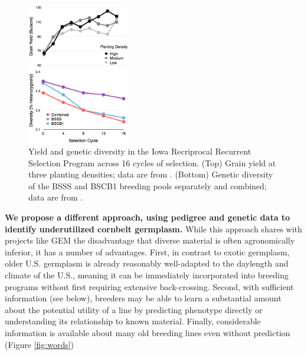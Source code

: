 \documentclass[12pt]{article}
\begin{document}
% 
%
\begin{figure}
    \includegraphics[width=0.4\textwidth]{BSSS.png}
  \caption{Yield and genetic diversity in the Iowa Recriprocal Recurrent Selection Program across 16 cycles of selection. (Top) Grain yield at three planting densities; data are from \citet{rouse2003selection}. (Bottom) Genetic diversity of the BSSS and BSCB1 breeding pools separately and combined; data are from \citet{Gerke:2013tw}.}
\label{fig:trends}
\end{figure}

\textbf{We propose a different approach, using pedigree and genetic data to identify underutilized cornbelt germplasm.}  
While this approach shares with projects like GEM the disadvantage that diverse material is often  agronomically inferior, it has a number of advantages.  
First, in contrast to exotic germplasm, older U.S. germplasm is already reasonably well-adapted to the daylength and climate of the U.S., meaning it can be immediately incorporated into breeding programs without first requiring extensive back-crossing.
Second, with sufficient information (see below), breeders may be able to learn a substantial amount about the potential utility of a line by predicting phenotype directly or understanding its relationship to known material. 
Finally, considerable information is available about many old breeding lines even without prediction (Figure \ref{fig:words})
\end{document}
